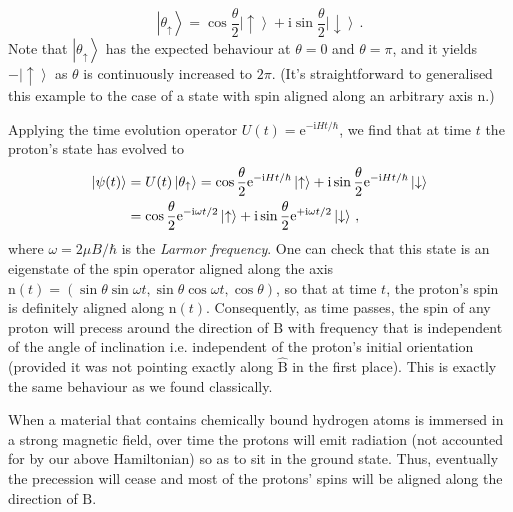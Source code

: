 \documentclass{article}
\theoremstyle{plain}\theoremheaderfont{\normalfont\itshape}\theorembodyfont{\rmfamily}\theoremseparator{.}\newtheorem*{rem}{Remark}\newtheorem*{ex}{Example}\newtheorem*{proof}{Proof}\newtheorem*{altp}{Alternative proof}
\theoremstyle{plain}\theoremheaderfont{\normalfont\bfseries}\theorembodyfont{\rmfamily}\theoremseparator{.}\newtheorem{thm}{Theorem}[section]\newtheorem{lem}[thm]{Lemma}\newtheorem{prop}[thm]{Proposition}\newtheorem*{cor}{Corollary}\newtheorem{defn}[thm]{Definition}\newtheorem{clm}[thm]{Claim}\newtheorem{clminproof}{Claim}
\theoremstyle{break}\theoremheaderfont{\normalfont\itshape}\theorembodyfont{\rmfamily}\theoremseparator{.\medskip}\newtheorem*{proofskip}{Proof}\newtheorem*{exs}{Examples}\newtheorem*{rems}{Remarks}
\theoremstyle{break}\theoremheaderfont{\normalfont\bfseries}\theorembodyfont{\rmfamily}\theoremseparator{.\medskip}\newtheorem{lemskip}[thm]{Lemma}\newtheorem{defnskip}[thm]{Definition}\newtheorem{propskip}[thm]{Proposition}\newtheorem{thmskip}[thm]{Theorem}
\numberwithin{equation}{section}
\newcommand{\ii}{\mathrm{i}}
\newcommand{\ee}{\mathrm{e}}
\newcommand{\ket}[1]{\left| #1 \right\rangle}
\newcommand{\vb}[1]{\bm{\mathrm{#1}}}
\newcommand{\vu}[1]{\hat{\bm{\mathrm{#1}}}}
\begin{document}
    \begin{equation}
        \ket{\theta_\uparrow}=\cos\frac{\theta}{2}\ket{\uparrow}+\ii\sin\frac{\theta}{2}\ket{\downarrow}\,.
    \end{equation}
    Note that \(\ket{\theta_\uparrow}\) has the expected behaviour at \(\theta=0\) and \(\theta=\pi\), and it yields \(-\ket{\uparrow}\) as \(\theta\) is continuously increased to \(2\pi\). (It's straightforward to generalised this example to the case of a state with spin aligned along an arbitrary axis \(\vb{n}\).)

    Applying the time evolution operator \(U(t)=\ee^{-\ii Ht/\hbar}\), we find that at time \(t\) the proton's state has evolved to
    \begin{align}
        \ket{\psi(t)}&=U(t)\ket{\theta_\uparrow}=\cos\frac{\theta}{2}\ee^{-\ii Ht/\hbar}\ket{\uparrow}+\ii\sin\frac{\theta}{2}\ee^{-\ii Ht/\hbar}\ket{\downarrow}\notag\\
        &=\cos\frac{\theta}{2}\ee^{-\ii \omega t/2}\ket{\uparrow}+\ii\sin\frac{\theta}{2}\ee^{+\ii \omega t/2}\ket{\downarrow}\,,
    \end{align}
    where \(\omega=2\mu B/\hbar\) is the \textit{Larmor frequency}. One can check that this state is an eigenstate of the spin operator aligned along the axis \(\vb{n}(t)=(\sin\theta\sin\omega t, \sin\theta\cos\omega t, \cos\theta)\), so that at time \(t\), the proton's spin is definitely aligned along \(\vb{n}(t)\). Consequently, as time passes, the spin of any proton will precess around the direction of \(\vb{B}\) with frequency that is independent of the angle of inclination i.e. independent of the proton's initial orientation (provided it was not pointing exactly along \(\vu{B}\) in the first place). This is exactly the same behaviour as we found classically.

    When a material that contains chemically bound hydrogen atoms is immersed in a strong magnetic field, over time the protons will emit radiation (not accounted for by our above Hamiltonian) so as to sit in the ground state. Thus, eventually the precession will cease and most of the protons' spins will be aligned along the direction of \(\vb{B}\).
\end{document}
